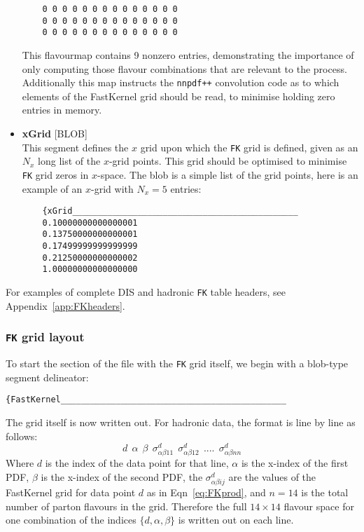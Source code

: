 \documentclass[11pt]{article}
\newcommand{\be}{\begin{equation}}
\newcommand{\ee}{\end{equation}}
\begin{document}
\begin{itemize}
\begin{verbatim}
    0 0 0 0 0 0 0 0 0 0 0 0 0 0
    0 0 0 0 0 0 0 0 0 0 0 0 0 0
    0 0 0 0 0 0 0 0 0 0 0 0 0 0
    \end{verbatim}
    This flavourmap contains 9 nonzero entries, demonstrating the importance of only
    computing those flavour combinations that are relevant to the process.
    Additionally this map instructs the {\tt nnpdf++} convolution code as to which
    elements of the FastKernel grid should be read, to minimise holding zero entries
    in memory.
\item \textbf{xGrid} [BLOB]\\
    This segment defines the $x$ grid upon which the {\tt FK} grid is defined,
    given as an $N_x$ long list of the $x$-grid points. This grid should be
    optimised to minimise {\tt FK} grid zeros in $x$-space. The blob is a simple
    list of the grid points, here is an example of an $x$-grid with $N_x=5$
    entries:
    \begin{verbatim}
    {xGrid_____________________________________________
    0.10000000000000001
    0.13750000000000001
    0.17499999999999999
    0.21250000000000002
    1.00000000000000000
    \end{verbatim}
\end{itemize}

For examples of complete DIS and hadronic {\tt FK} table headers, see
Appendix~\ref{app:FKheaders}.



\subsubsection*{{\tt FK} grid layout}
To start the section of the file with the {\tt FK} grid itself, we begin with a
blob-type segment delineator:
%
\begin{verbatim}
{FastKernel_____________________________________________
\end{verbatim}
The grid itself is now written out. For hadronic data, the format is line by line as follows:
%
\be d \:\: \alpha \:\: \beta \:\: \sigma^d_{\alpha\beta 1 1} \:\: \sigma^d_{\alpha\beta 1 2}\:\: ....\:\: \sigma^d_{\alpha\beta n n} \ee
%
Where $d$ is the index of the data point for that line, $\alpha$ is the x-index
of the first PDF, $\beta$ is the x-index of the second PDF, the
$\sigma^d_{\alpha\beta i j}$ are the values of the FastKernel grid for data
point $d$ as in Eqn~\ref{eq:FKprod}, and $n=14$ is the total number of parton
flavours in the grid. Therefore the full $14\times 14$ flavour space for one
combination of the indices $\{d,\alpha,\beta\}$ is written out on each line.
\end{document}
